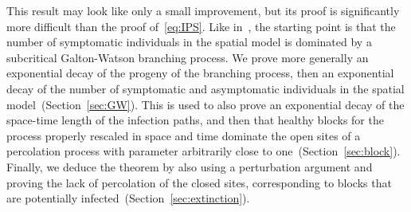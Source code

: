 \documentclass[letterpaper,11pt,twoside,keywordsasfootnote,addressatend,noinfoline]{article}
\begin{document}
 This result may look like only a small improvement, but its proof is significantly more difficult than the proof of~\eqref{eq:IPS}.
 Like in~\cite{belhadi_lanchier_mercer_2024}, the starting point is that the number of symptomatic individuals in the spatial model is dominated by a subcritical Galton-Watson branching process.
 We prove more generally an exponential decay of the progeny of the branching process, then an exponential decay of the number of symptomatic and asymptomatic individuals in the spatial model~(Section~\ref{sec:GW}).
 This is used to also prove an exponential decay of the space-time length of the infection paths, and then that healthy blocks for the process properly rescaled in space and time dominate the open sites of a percolation process with parameter arbitrarily close to one~(Section~\ref{sec:block}).
 Finally, we deduce the theorem by also using a perturbation argument and proving the lack of percolation of the closed sites, corresponding to blocks that are potentially infected~(Section~\ref{sec:extinction}).

\end{document}
